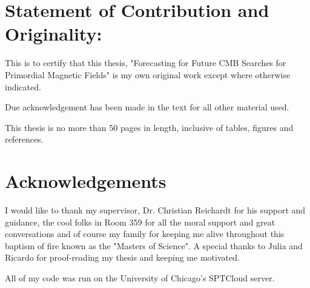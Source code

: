\section*{Statement of Contribution and Originality:}

This is to certify that this thesis, "Forecasting for Future CMB Searches for Primordial Magnetic Fields" is my own original work except where otherwise indicated.

Due acknowledgement has been made in the text for all other material used.

This thesis is no more than 50 pages in length, inclusive of tables, figures and references.

\section*{Acknowledgements}

I would like to thank my supervisor, Dr. Christian Reichardt for his support and guidance, the cool folks in Room 359 for all the moral support and great conversations and of course my family for keeping me alive throughout this baptism of fire known as the "Masters of Science". A special thanks to Julia and Ricardo for proof-reading my thesis and keeping me motivated.

All of my code was run on the University of Chicago's SPTCloud server.
